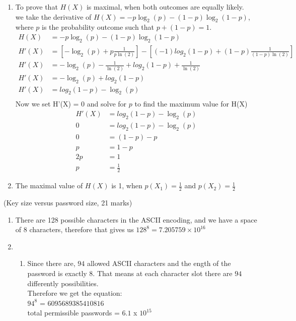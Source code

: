 \documentclass{assignment}
\begin{document}
\begin{problemlist}
\begin{problem}
\begin{answer}
\begin{enumerate}[label=(\alph*)]
	\item 	To prove that $H(X)$ is maximal, when both outcomes are equally likely. \\
			we take the derivative of  $H(X) = -p \log_2 (p) - (1-p) \log_2 (1-p)$, where $p$ is the probability 
			outcome such that $p + (1-p) = 1$. \\
			\begin{align*}
					H(X) &= -p \log_2 (p) - (1\!-\!p) \log_2 (1\!-\!p)\\
					H'(X) &= [  - \log_2(p)   + p \frac{1}{ p\ln(2)}] - [ (-1) log_2(1-p) + (1\!-\!p) \frac{1}{ (1-p)\ln(2)}  ]\\
					H'(X) &=  - \log_2(p) - \frac{1}{ \ln(2)}  + log_2(1-p) +  \frac{1}{ \ln(2)}  \\ 
					H'(X) &=  - \log_2(p) + log_2(1-p) \\ 
					H'(X) &=  log_2(1-p) - \log_2(p) \\ 
			\end{align*}
			Now we set H'(X) = 0 and solve for $p$ to find the maximum value for H(X) \\
			\begin{align*}
					H'(X) &=  log_2(1-p) - \log_2(p) \\ 
					0 &=  log_2(1-p) - \log_2(p) \\ 
					0 &=  (1-p) - p \\
					p & = 1 - p \\
					2p &= 1 \\
					p &= \frac{1}{2} 
			\end{align*}			
	\item 	The maximal value of $H(X)$ is 1, when $p(X_1) = \frac{1}{2}$ and $p(X_2) = \frac{1}{2}$
\end{enumerate}
\end{answer}
\end{problem}

\clearpage

\pbitem (Key size versus password size, 21 marks)
\begin{problem}
\begin{answer}
\begin{enumerate}[label=(\alph*)]
	\item	There are 128 possible characters in the ASCII encoding, and we have a space of 8 characters, therefore that gives us $128^8 = 
7.205759 \times 10^{16}$
	\item 	\begin{enumerate}[label=(\roman*)]
			\item Since there are, $94$ allowed ASCII characters and the ength of the password is exactly $8$. That means at each character slot there are $94$ differently possibilities.\\
			Therefore we get the equation:\\
				$94^8$  = $6095689385410816$ \\
				total permissible passwords = $6.1$ x $10^{15}$ 
			

\end{enumerate}
\end{enumerate}
\end{answer}
\end{problem}
\end{problemlist}
\end{document}
